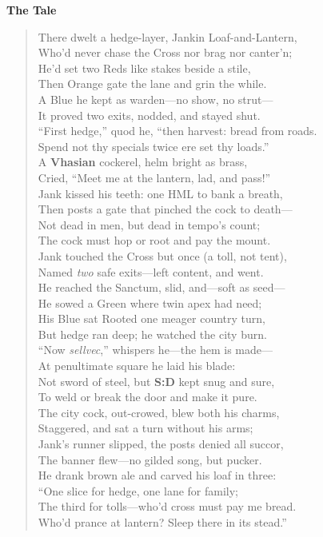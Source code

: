\documentclass[11pt]{article}
\begin{document}
\noindent\textbf{The Tale}

\begin{verse}
There dwelt a hedge-layer, Jankin Loaf-and-Lantern,\\
Who’d never chase the Cross nor brag nor canter’n;\\
He’d set two Reds like stakes beside a stile,\\
Then Orange gate the lane and grin the while.\\
A Blue he kept as warden—no show, no strut—\\
It proved two exits, nodded, and stayed shut.\\
“First hedge,” quod he, “then harvest: bread from roads.\\
Spend not thy specials twice ere set thy loads.”\\[0.4em]

A \textbf{Vhasian} cockerel, helm bright as brass,\\
Cried, “Meet me at the lantern, lad, and pass!”\\
Jank kissed his teeth: one \textsc{HML} to bank a breath,\\
Then posts a gate that pinched the cock to death—\\
Not dead in men, but dead in tempo’s count;\\
The cock must hop or root and pay the mount.\\
Jank touched the Cross but once (a toll, not tent),\\
Named \emph{two} safe exits—left content, and went.\\[0.4em]

He reached the Sanctum, slid, and—soft as seed—\\
He sowed a Green where twin apex had need;\\
His Blue sat Rooted one meager country turn,\\
But hedge ran deep; he watched the city burn.\\
“Now \emph{sellvec},” whispers he—the hem is made—\\
At penultimate square he laid his blade:\\
Not sword of steel, but \textbf{S:D} kept snug and sure,\\
To weld or break the door and make it pure.\\[0.4em]

The city cock, out-crowed, blew both his charms,\\
Staggered, and sat a turn without his arms;\\
Jank’s runner slipped, the posts denied all succor,\\
The banner flew—no gilded song, but pucker.\\
He drank brown ale and carved his loaf in three:\\
“One slice for hedge, one lane for family;\\
The third for tolls—who’d cross must pay me bread.\\
Who’d prance at lantern? Sleep there in its stead.”
\end{verse}
\end{document}
